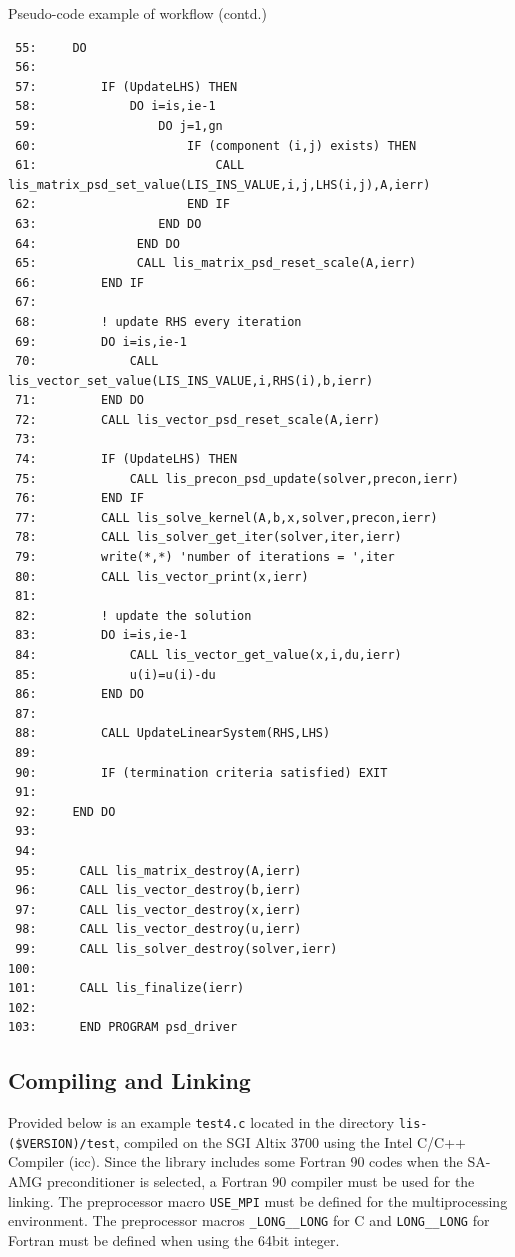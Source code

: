 \documentclass[a4paper]{article}
\begin{document}
\begin{itemsquarebox}[l]{Pseudo-code example of workflow (contd.)}
{\small
\begin{verbatim}
 55:     DO
 56:
 57:         IF (UpdateLHS) THEN
 58:             DO i=is,ie-1
 59:                 DO j=1,gn
 60:                     IF (component (i,j) exists) THEN
 61:                         CALL lis_matrix_psd_set_value(LIS_INS_VALUE,i,j,LHS(i,j),A,ierr)
 62:                     END IF
 63:                 END DO
 64:              END DO
 65:              CALL lis_matrix_psd_reset_scale(A,ierr)
 66:         END IF
 67:
 68:         ! update RHS every iteration
 69:         DO i=is,ie-1
 70:             CALL lis_vector_set_value(LIS_INS_VALUE,i,RHS(i),b,ierr)
 71:         END DO
 72:         CALL lis_vector_psd_reset_scale(A,ierr)
 73:
 74:         IF (UpdateLHS) THEN
 75:             CALL lis_precon_psd_update(solver,precon,ierr)
 76:         END IF
 77:         CALL lis_solve_kernel(A,b,x,solver,precon,ierr)
 78:         CALL lis_solver_get_iter(solver,iter,ierr)
 79:         write(*,*) 'number of iterations = ',iter
 80:         CALL lis_vector_print(x,ierr)
 81:
 82:         ! update the solution
 83:         DO i=is,ie-1
 84:             CALL lis_vector_get_value(x,i,du,ierr)
 85:             u(i)=u(i)-du
 86:         END DO
 87:
 88:         CALL UpdateLinearSystem(RHS,LHS)
 89:
 90:         IF (termination criteria satisfied) EXIT
 91:
 92:     END DO
 93:
 94:
 95:      CALL lis_matrix_destroy(A,ierr)
 96:      CALL lis_vector_destroy(b,ierr)
 97:      CALL lis_vector_destroy(x,ierr)
 98:      CALL lis_vector_destroy(u,ierr)
 99:      CALL lis_solver_destroy(solver,ierr)
100:
101:      CALL lis_finalize(ierr)
102:
103:      END PROGRAM psd_driver
\end{verbatim}
}
\end{itemsquarebox}

\newpage
\subsection{Compiling and Linking}
Provided below is an example {\tt test4.c} located in
the directory \verb|lis-($VERSION)/test|, 
compiled on the SGI Altix 3700 using the Intel C/C++ Compiler (icc). 
Since the library includes some Fortran 90 codes 
when the SA-AMG preconditioner is selected, 
a Fortran 90 compiler must be used for the linking. 
The preprocessor macro \verb|USE_MPI| must be defined for the
multiprocessing environment. 
The preprocessor macros {\tt \_LONG\_\_LONG} for C and {\tt LONG\_\_LONG} 
for Fortran must be defined when using the 64bit integer.
\end{document}
